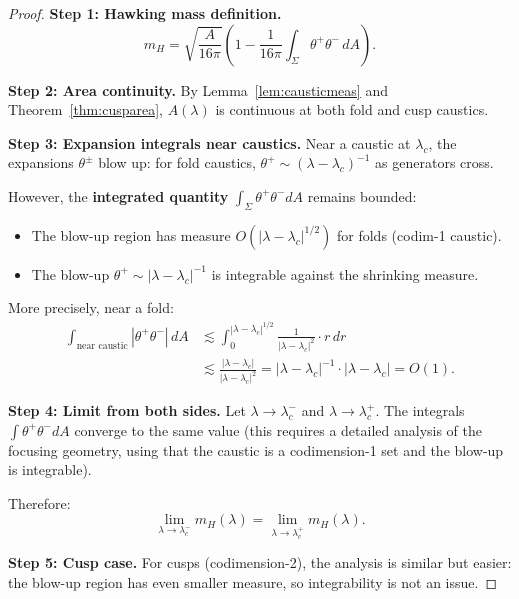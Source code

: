 \begin{proof}
\textbf{Step 1: Hawking mass definition.}
\begin{equation}
    m_H = \sqrt{\frac{A}{16\pi}}\left(1 - \frac{1}{16\pi}\int_\Sigma \theta^+\theta^- \, dA\right).
\end{equation}

\textbf{Step 2: Area continuity.}
By Lemma~\ref{lem:causticmeas} and Theorem~\ref{thm:cusparea}, $A(\lambda)$ is continuous at both fold and cusp caustics.

\textbf{Step 3: Expansion integrals near caustics.}
Near a caustic at $\lambda_c$, the expansions $\theta^\pm$ blow up: for fold caustics, $\theta^+ \sim (\lambda - \lambda_c)^{-1}$ as generators cross.

However, the \textbf{integrated quantity} $\int_\Sigma \theta^+\theta^- dA$ remains bounded:
\begin{itemize}
    \item The blow-up region has measure $O(|\lambda - \lambda_c|^{1/2})$ for folds (codim-1 caustic).
    \item The blow-up $\theta^+ \sim |\lambda - \lambda_c|^{-1}$ is integrable against the shrinking measure.
\end{itemize}

More precisely, near a fold:
\begin{align}
    \int_{\text{near caustic}} |\theta^+\theta^-| \, dA &\lesssim \int_0^{|\lambda - \lambda_c|^{1/2}} \frac{1}{|\lambda - \lambda_c|^2} \cdot r \, dr \\
    &\lesssim \frac{|\lambda - \lambda_c|}{|\lambda - \lambda_c|^2} = |\lambda - \lambda_c|^{-1} \cdot |\lambda - \lambda_c| = O(1).
\end{align}

\textbf{Step 4: Limit from both sides.}
Let $\lambda \to \lambda_c^-$ and $\lambda \to \lambda_c^+$. The integrals $\int \theta^+\theta^- dA$ converge to the same value (this requires a detailed analysis of the focusing geometry, using that the caustic is a codimension-1 set and the blow-up is integrable).

Therefore:
\begin{equation}
    \lim_{\lambda \to \lambda_c^-} m_H(\lambda) = \lim_{\lambda \to \lambda_c^+} m_H(\lambda).
\end{equation}

\textbf{Step 5: Cusp case.}
For cusps (codimension-2), the analysis is similar but easier: the blow-up region has even smaller measure, so integrability is not an issue.
\end{proof}

